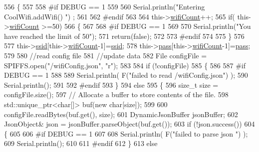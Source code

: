 \begin{DoxyCode}
556 \{
557 
558 \textcolor{preprocessor}{#if DEBUG == 1}
559     
560     Serial.println(\textcolor{stringliteral}{"Entering CoolWifi.addWifi() "}) ;
561 
562 \textcolor{preprocessor}{#endif  }
563     
564     this->\hyperlink{class_cool_wifi_ab133bd92fcb895b884deecd6678592e4}{wifiCount}++;
565     \textcolor{keywordflow}{if}( this->\hyperlink{class_cool_wifi_ab133bd92fcb895b884deecd6678592e4}{wifiCount} >=50)
566     \{
567     
568 \textcolor{preprocessor}{    #if DEBUG == 1}
569 
570         Serial.println(\textcolor{stringliteral}{"You have reached the limit of 50"});
571         \textcolor{keywordflow}{return}(\textcolor{keyword}{false});  
572     
573 \textcolor{preprocessor}{    #endif}
574 
575     \}
576 
577     this->\hyperlink{class_cool_wifi_a893b21d0fed821438733bba2e73fb4c2}{ssid}[this->\hyperlink{class_cool_wifi_ab133bd92fcb895b884deecd6678592e4}{wifiCount}-1]=\hyperlink{class_cool_wifi_a893b21d0fed821438733bba2e73fb4c2}{ssid};
578     this->\hyperlink{class_cool_wifi_a0c3332a149245aaad060b32593a54c9b}{pass}[this->\hyperlink{class_cool_wifi_ab133bd92fcb895b884deecd6678592e4}{wifiCount}-1]=\hyperlink{class_cool_wifi_a0c3332a149245aaad060b32593a54c9b}{pass};
579     
580     \textcolor{comment}{//read config file}
581     \textcolor{comment}{//update data}
582     File configFile = SPIFFS.open(\textcolor{stringliteral}{"/wifiConfig.json"}, \textcolor{stringliteral}{"r"});
583 
584     \textcolor{keywordflow}{if} (!configFile) 
585     \{
586     
587 \textcolor{preprocessor}{    #if DEBUG == 1 }
588 
589         Serial.println( F(\textcolor{stringliteral}{"failed to read /wifiConfig.json"}) );
590         Serial.println();
591 
592 \textcolor{preprocessor}{    #endif}
593     \}
594     \textcolor{keywordflow}{else}
595     \{
596         \textcolor{keywordtype}{size\_t} size = configFile.size();
597         \textcolor{comment}{// Allocate a buffer to store contents of the file.}
598         std::unique\_ptr<char[]> buf(\textcolor{keyword}{new} \textcolor{keywordtype}{char}[size]);
599 
600         configFile.readBytes(buf.get(), size);
601         DynamicJsonBuffer jsonBuffer;
602         JsonObject& json = jsonBuffer.parseObject(buf.get());
603         \textcolor{keywordflow}{if} (!json.success()) 
604         \{
605         
606 \textcolor{preprocessor}{        #if DEBUG == 1 }
607 
608             Serial.println( F(\textcolor{stringliteral}{"failed to parse json "}) );
609             Serial.println();
610         
611 \textcolor{preprocessor}{        #endif}
612         \} 
613         \textcolor{keywordflow}{else}

\end{DoxyCode}

